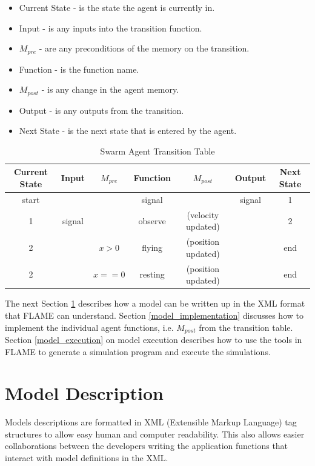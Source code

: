 \documentclass[a4paper,11pt]{article}
\begin{document}
\begin{itemize}
  \item Current State - is the state the agent is currently in.
  \item Input - is any inputs into the transition function.
  \item $M_{pre}$ - are any preconditions of the memory on the transition.
  \item Function - is the function name.
  \item $M_{post}$ - is any change in the agent memory.
  \item Output - is any outputs from the transition.
  \item Next State - is the next state that is entered by the agent.
\end{itemize}

\begin{table}[ht]
\centering
\begin{tabular}{|c|c|c||c||c|c|c|}
\hline
Current State&Input&$M_{pre}$&Function&$M_{post}$&Output&Next State\\
\hline \hline
start&&&signal&&signal&1\\
\hline
1&signal&&observe&(velocity updated)&&2\\
\hline
2&&$x > 0$&flying&(position updated)&&end\\
\hline
2&&$x == 0$&resting&(position updated)&&end\\
\hline
\end{tabular}
\caption{Swarm Agent Transition Table} \label{tab:swarmtransition}
\end{table}

The next Section \ref{model_description} describes how a model can
be written up in the XML format that FLAME can understand. Section
\ref{model_implementation} discusses how to implement the individual
agent functions, i.e. $M_{post}$ from the transition table. Section
\ref{model_execution} on model execution describes how to use the
tools in FLAME to generate a simulation program and execute the
simulations.

\section{Model Description}
\label{model_description}

Models descriptions are formatted in XML (Extensible Markup
Language) tag structures to allow easy human and computer
readability. This also allows easier collaborations between the
developers writing the application functions that interact with
model definitions in the XML.
\end{document}
